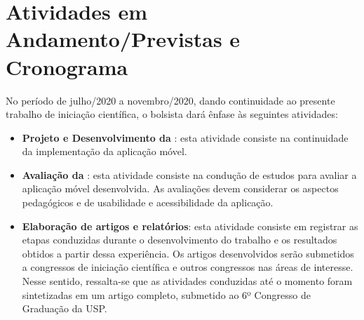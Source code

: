 \chapter{Atividades em Andamento/Previstas e Cronograma} \label{sec:atividades_futuras}

No período de julho/2020 a novembro/2020, dando continuidade ao presente trabalho de iniciação científica, o bolsista dará ênfase às seguintes atividades:

\begin{itemize}
    
    \item \textbf{Projeto e Desenvolvimento da \crossword}: esta atividade consiste na continuidade da implementação da aplicação móvel.
    \item \textbf{Avaliação da \crossword}: esta atividade consiste na condução de estudos  para avaliar a aplicação móvel desenvolvida. As avaliações devem considerar os aspectos pedagógicos e de usabilidade e acessibilidade da aplicação.
    \item \textbf{Elaboração de artigos e relatórios}: esta atividade consiste em registrar as etapas conduzidas durante o desenvolvimento do trabalho e os resultados obtidos a partir dessa experiência. Os artigos desenvolvidos serão submetidos a congressos de iniciação científica e outros congressos nas áreas de interesse.
    Nesse sentido, ressalta-se que as atividades conduzidas até o momento foram sintetizadas em um artigo completo, submetido ao 6º Congresso de Graduação da USP. 
\end{itemize}

